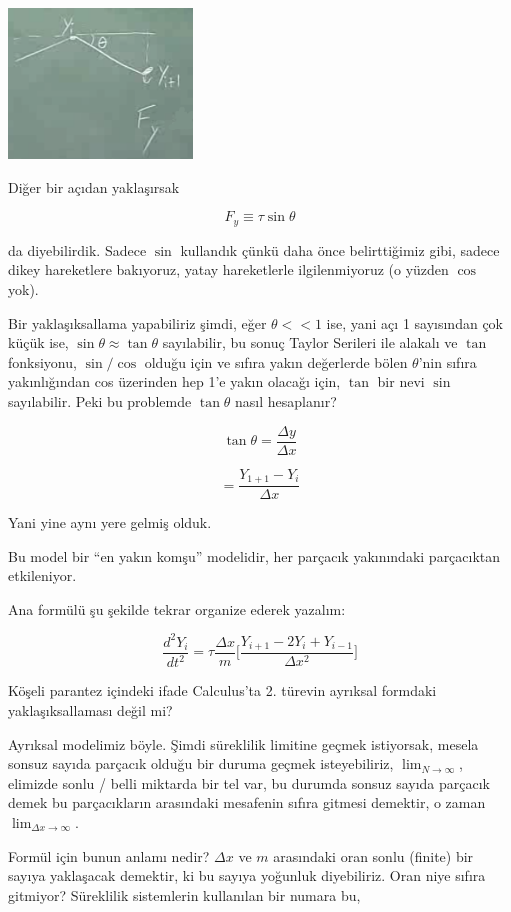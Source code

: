 \documentclass[12pt,fleqn]{article}\usepackage{../../common}
\begin{document}
\includegraphics[height=4cm]{1_09.png}

Diğer bir açıdan yaklaşırsak

$$ F_y \equiv \tau \sin\theta $$

da diyebilirdik. Sadece $\sin$ kullandık çünkü daha önce belirttiğimiz gibi,
sadece dikey hareketlere bakıyoruz, yatay hareketlerle ilgilenmiyoruz (o
yüzden $\cos$ yok).

Bir yaklaşıksallama yapabiliriz şimdi, eğer $\theta << 1$ ise, yani açı 1
sayısından çok küçük ise, $\sin \theta \approx \tan \theta$ sayılabilir, bu
sonuç Taylor Serileri ile alakalı ve $\tan$ fonksiyonu, $\sin / \cos$
olduğu için ve sıfıra yakın değerlerde bölen $\theta$'nin sıfıra
yakınlığından cos üzerinden hep 1'e yakın olacağı için, $\tan$ bir nevi
$\sin$ sayılabilir. Peki bu problemde $\tan \theta$ nasıl hesaplanır?

$$  \tan\theta = \frac{\Delta y}{\Delta x} $$

$$ = \frac{Y_{1+1}-Y_i}{\Delta x} $$

Yani yine aynı yere gelmiş olduk. 

Bu model bir ``en yakın komşu'' modelidir, her parçacık yakınındaki
parçacıktan etkileniyor. 

Ana formülü şu şekilde tekrar organize ederek yazalım:

$$ \frac{d^2Y_i}{dt^2} = 
\tau \frac{\Delta x}{m} \bigg[
\frac{Y_{i+1} - 2Y_i + Y_{i-1}}{\Delta x^2}
\bigg]
$$

Köşeli parantez içindeki ifade Calculus'ta 2. türevin ayrıksal formdaki
yaklaşıksallaması değil mi?

Ayrıksal modelimiz böyle. Şimdi süreklilik limitine geçmek istiyorsak,
mesela sonsuz sayıda parçacık olduğu bir duruma geçmek isteyebiliriz,
$\lim_{N \to \infty}$, elimizde sonlu / belli miktarda bir tel var, bu durumda 
sonsuz sayıda parçacık demek bu parçacıkların arasındaki mesafenin sıfıra 
gitmesi demektir, o zaman $\lim_{\Delta x \to \infty}$. 

Formül için bunun anlamı nedir? $\Delta x$ ve $m$ arasındaki oran sonlu
(finite) bir sayıya yaklaşacak demektir, ki bu sayıya yoğunluk
diyebiliriz. Oran niye sıfıra gitmiyor? Süreklilik sistemlerin kullanılan
bir numara bu,
\end{document}
